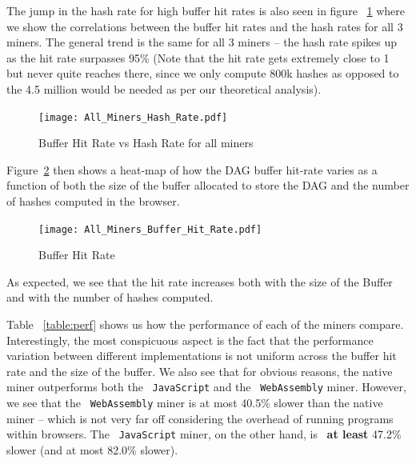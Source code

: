 \documentclass[runningheads]{llncs}
\begin{document}
The jump in the hash rate for high buffer hit rates is also seen in figure ~\ref{fig:bufferRatevsHashRate} where we show the correlations between the buffer hit rates and the hash rates for all 3 miners. The general trend is the same for all 3 miners -- the hash rate spikes up as the hit rate surpasses 95\% (Note that the hit rate gets extremely close to 1 but never quite reaches there, since we only compute 800k hashes as opposed to the 4.5 million would be needed as per our theoretical analysis).

\begin{figure}[h]
\centering
\texttt{[image: All\_Miners\_Hash\_Rate.pdf]}
\caption{\label{fig:bufferRatevsHashRate} Buffer Hit Rate vs Hash Rate for all miners}
\end{figure}

Figure~\ref{fig:bufferRateHM} then shows a heat-map of how the DAG buffer hit-rate varies as a function of both the size of the buffer allocated to store the DAG and the number of hashes computed in the browser. 

\begin{figure}[H]
\centering
\texttt{[image: All\_Miners\_Buffer\_Hit\_Rate.pdf]}
\caption{\label{fig:bufferRateHM} Buffer Hit Rate}
\end{figure}

As expected, we see that the hit rate increases both with the size of the Buffer and with the number of hashes computed.

Table ~\ref{table:perf} shows us how the performance of each of the miners compare. Interestingly, the most conspicuous aspect is the fact that the performance variation between different implementations is not uniform across the buffer hit rate and the size of the buffer. We also see that for obvious reasons, the native miner outperforms both the ~\verb|JavaScript| and the ~\verb|WebAssembly| miner. However, we see that the ~\verb|WebAssembly| miner is at most 40.5\% slower than the native miner -- which is not very far off considering the overhead of running programs within browsers. The ~\verb|JavaScript| miner, on the other hand, is ~\textbf{at least} 47.2\% slower (and at most 82.0\% slower).
\end{document}
